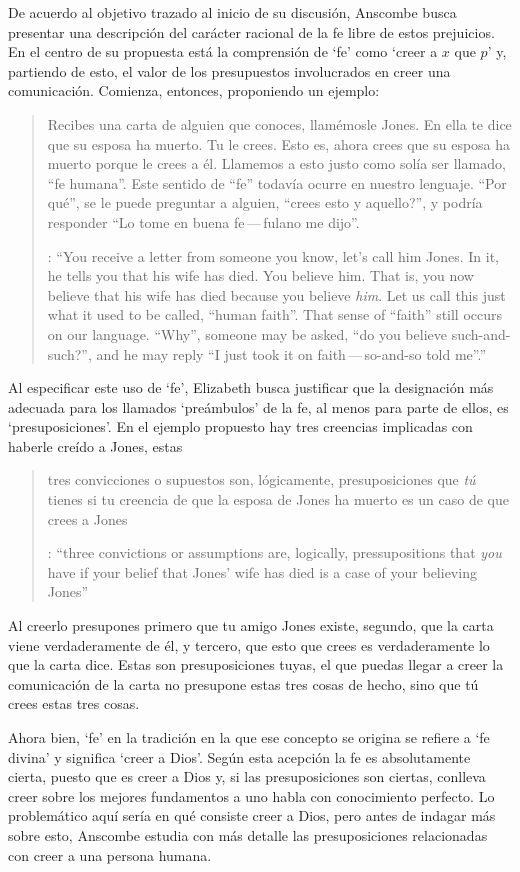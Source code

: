 De acuerdo al objetivo trazado al inicio de su discusión, Anscombe busca presentar una descripción del carácter racional de la fe libre de estos prejuicios. En el centro de su propuesta está la comprensión de `fe' como `creer a $x$ que $p$' y, partiendo de esto, el valor de los presupuestos involucrados en creer una comunicación. Comienza, entonces, proponiendo un ejemplo: \blockquote[{\cite[114]{anscombe1981erp:faith}}: \enquote{You receive a letter from someone you know, let's call him Jones. In it, he tells you that his wife has died. You believe him. That is, you now believe that his wife has died because you believe \emph{him}. Let us call this just what it used to be called, ``human faith''. That sense of ``faith'' still occurs on our language. ``Why'', someone may be asked, ``do you believe such-and-such?'', and he may reply ``I just took it on faith\,---\,so-and-so told me''.}]{Recibes una carta de alguien que conoces, llamémosle Jones. En ella te dice que su esposa ha muerto. Tu le crees. Esto es, ahora crees que su esposa ha muerto porque le crees a él. Llamemos a esto justo como solía ser llamado, ``fe humana''. Este sentido de ``fe'' todavía ocurre en nuestro lenguaje. ``Por qué'', se le puede preguntar a alguien, ``crees esto y aquello?'', y podría responder ``Lo tome en buena fe\,---\,fulano me dijo''.} Al especificar este uso de `fe', Elizabeth busca justificar que la designación más adecuada para los llamados `preámbulos' de la fe, al menos para parte de ellos, es `presuposiciones'. En el ejemplo propuesto hay tres creencias implicadas con haberle creído a Jones, estas \blockquote[{\cite[114]{anscombe1981erp:faith}}: \enquote{three convictions or assumptions are, logically, pressupositions that \emph{you} have if your belief that Jones' wife has died is a case of your believing Jones}]{tres convicciones o supuestos son, lógicamente, presuposiciones que \emph{tú} tienes si tu creencia de que la esposa de Jones ha muerto es un caso de que crees a Jones}.

Al creerlo presupones primero que tu amigo Jones existe, segundo, que la carta viene verdaderamente de él, y tercero, que esto que crees es verdaderamente lo que la carta dice. Estas son presuposiciones tuyas, el que puedas llegar a creer la comunicación de la carta no presupone estas tres cosas de hecho, sino que tú crees estas tres cosas.

Ahora bien, `fe' en la tradición en la que ese concepto se origina se refiere a `fe divina' y significa `creer a Dios'. Según esta acepción la fe es absolutamente cierta, puesto que es creer a Dios y, si las presuposiciones son ciertas, conlleva creer sobre los mejores fundamentos a uno habla con conocimiento perfecto. Lo problemático aquí sería en qué consiste creer a Dios, pero antes de indagar más sobre esto, Anscombe estudia con más detalle las presuposiciones relacionadas con creer a una persona humana.

